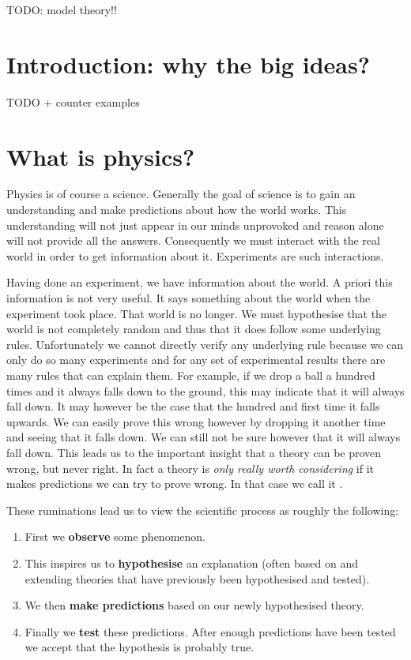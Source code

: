 \documentclass{report}
\begin{document}
TODO: model theory!!

\chapter{Introduction: why the big ideas?}
TODO + counter examples

\chapter{What is physics?}
Physics is of course a science. Generally the goal of science is to gain an understanding and make predictions about how the world works. This understanding will not just appear in our minds unprovoked and reason alone will not provide all the answers. Consequently we must interact with the real world in order to get information about it. Experiments are such interactions.

Having done an experiment, we have information about the world. A priori this information is not very useful. It says something about the world when the experiment took place. That world is no longer. We must hypothesise that the world is not completely random and thus that it does follow some underlying rules. Unfortunately we cannot directly verify any underlying rule because we can only do so many experiments and for any set of experimental results there are many rules that can explain them. For example, if we drop a ball a hundred times and it always falls down to the ground, this may indicate that it will always fall down. It may however be the case that the hundred and first time it falls upwards. We can easily prove this wrong however by dropping it another time and seeing that it falls down. We can still not be sure however that it will always fall down. This leads us to the important insight that a theory can be proven wrong, but never right. In fact a theory is \textit{only really worth considering} if it makes predictions we can try to prove wrong. In that case we call it .

These ruminations lead us to view the scientific process as roughly the following: 
\begin{enumerate}
\item First we \textbf{observe} some phenomenon.
\item This inspires us to \textbf{hypothesise} an explanation (often based on and extending theories that have previously been hypothesised and tested).
\item We then \textbf{make predictions} based on our newly hypothesised theory.
\item Finally we \textbf{test} these predictions. After enough predictions have been tested we accept that the hypothesis is probably true.
\end{enumerate}
\end{document}
